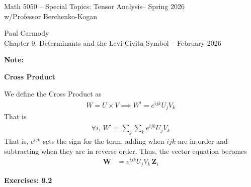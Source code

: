 \documentclass[12pt,a4paper]{report}
\newcommand{\CLASSNAME}{Math 5050 -- Special Topics: Tensor Analysis}
\newcommand{\STUDENTNAME}{Paul Carmody}
\newcommand{\ASSIGNMENT}{Chapter 9: Determinants and the Levi-Civita Symbol }
\newcommand{\DUEDATE}{February 2026}
\newcommand{\PROFESSOR}{Professor Berchenko-Kogan}
\newcommand{\SEMESTER}{Spring 2026}
\newcommand{\VK}[1]{\textbf{#1}}
\begin{document}
\begin{center}
	\Large{\CLASSNAME -- \SEMESTER} \\
	\large{ w/\PROFESSOR}
\end{center}
\begin{center}
	\STUDENTNAME \\
	\ASSIGNMENT -- \DUEDATE\\
\end{center} 

\textbf{\large{Note:}}
\begin{description}
	\item \textbf{Cross Product}
	
	We define the Cross Product as 
	\begin{align*}
		W = U \times V \implies	W^i= e^{ijk}U_jV_k
	\end{align*}That is 
	\begin{align*}
		\forall i,\, W^i = \sum_j\sum_k e^{ijk}U_jV_k
	\end{align*}That is, $e^{ijk}$ sets the sign for the term, adding when $ijk$ are in order and subtracting when they are in reverse order.  Thus, the vector equation becomes
	\begin{align*}
		\VK{W} &= e^{ijk}U_jV_k\,\VK{Z}_i
	\end{align*}
\end{description}
\HLINE
\noindent\textbf{Exercises: 9.2}
\end{document}

